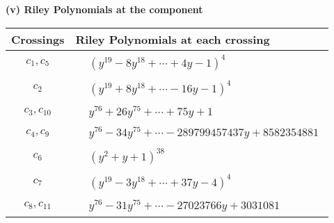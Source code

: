 \documentclass[1p]{elsarticle_modified}
\theoremstyle{definition}
\begin{document}
\flushleft \textbf{(v) Riley Polynomials at the component}\newline \\
\begin{tabular}{m{50pt}|m{274pt}}
Crossings & \hspace{64pt}Riley Polynomials at each crossing \\
\hline $$\begin{aligned}c_{1},c_{5}\end{aligned}$$&$\begin{aligned}
&(y^{19}-8 y^{18}+\cdots+4 y-1)^{4}
\end{aligned}$\\
\hline $$\begin{aligned}c_{2}\end{aligned}$$&$\begin{aligned}
&(y^{19}+8 y^{18}+\cdots-16 y-1)^{4}
\end{aligned}$\\
\hline $$\begin{aligned}c_{3},c_{10}\end{aligned}$$&$\begin{aligned}
&y^{76}+26 y^{75}+\cdots+75 y+1
\end{aligned}$\\
\hline $$\begin{aligned}c_{4},c_{9}\end{aligned}$$&$\begin{aligned}
&y^{76}-34 y^{75}+\cdots-289799457437 y+8582354881
\end{aligned}$\\
\hline $$\begin{aligned}c_{6}\end{aligned}$$&$\begin{aligned}
&(y^2+y+1)^{38}
\end{aligned}$\\
\hline $$\begin{aligned}c_{7}\end{aligned}$$&$\begin{aligned}
&(y^{19}-3 y^{18}+\cdots+37 y-4)^{4}
\end{aligned}$\\
\hline $$\begin{aligned}c_{8},c_{11}\end{aligned}$$&$\begin{aligned}
&y^{76}-31 y^{75}+\cdots-27023766 y+3031081
\end{aligned}$\\
\hline
\end{tabular}\\~\\
\end{document}
